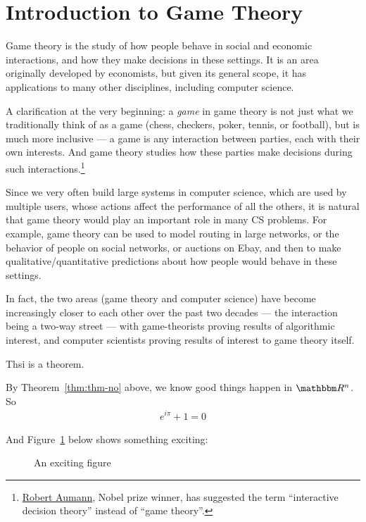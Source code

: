 \documentclass[11pt]{article}
\begin{document}
\newcommand{\lecdate}{January 22, 2016}
\newcommand{\lecturer}{Ravishankar Krishnaswamy}
\newcommand{\lecnum}{3}
\newcommand{\lectopic}{Cuckoo Hashing}
\newcommand{\scribe}{Your Name Here}
\makemyheader

\section{Introduction to Game Theory}

Game theory is the study of how people behave in social and economic
interactions, and how they make decisions in these settings. It is an
area originally developed by economists, but given its general scope, it
has applications to many other disciplines, including computer science.

A clarification at the very beginning: a \emph{game} in game theory is
not just what we traditionally think of as a game (chess, checkers,
poker, tennis, or football), but is much more inclusive --- a game is
any interaction between parties, each with their own interests. And game
theory studies how these parties make decisions during such
interactions.\footnote{\href{http://en.wikipedia.org/wiki/Robert_Aumann}{Robert Aumann}, Nobel prize winner, has suggested
  the term ``interactive decision theory'' instead of ``game theory''.}

Since we very often build large systems in computer science, which are
used by multiple users, whose actions affect the performance of all the
others, it is natural that game theory would play an important role in
many CS problems. For example, game theory can be used to model routing
in large networks, or the behavior of people on social networks, or
auctions on Ebay, and then to make qualitative/quantitative predictions
about how people would behave in these settings.

In fact, the two areas (game theory and computer science) have become
increasingly closer to each other over the past two decades --- the
interaction being a two-way street --- with game-theorists proving
results of algorithmic interest, and computer scientists proving results
of interest to game theory itself.


\begin{theorem}
  \label{thm:thm-no}
  Thsi is a theorem.
\end{theorem}

By Theorem~\ref{thm:thm-no} above, we know good things happen in
$\R^n$. So
\begin{gather}
  e^{i\pi} + 1 = 0
\end{gather}

And Figure~\ref{fig:ex} below shows something exciting:
\begin{figure}[h]
  \begin{center}
  \end{center}
  \caption{An exciting figure}
  \label{fig:ex}
\end{figure}
\end{document}
